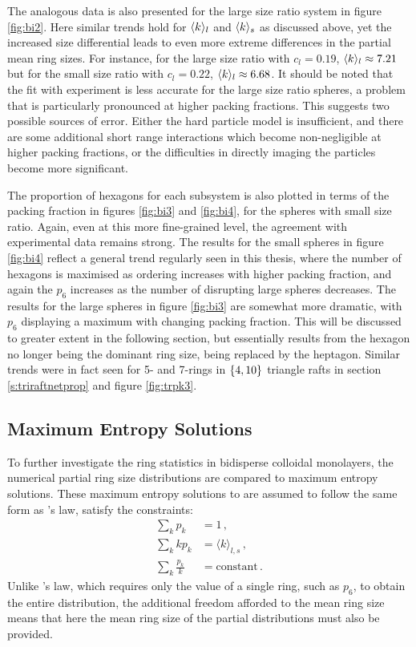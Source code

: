 The analogous data is also presented for the large size ratio system in figure \ref{fig:bi2}.
Here similar trends hold for $\langle k \rangle_l$ and $\langle k \rangle_s$ as discussed %
above, yet the increased size differential leads to even more extreme differences in the partial mean ring sizes.
For instance, for the large size ratio with $c_l=0.19$, $\langle k \rangle_l\approx7.21$ but for the small size ratio with $c_l=0.22$, $\langle k \rangle_l\approx6.68$.
It should be noted that the fit with experiment is less accurate for the large size ratio spheres, a problem that is particularly pronounced at higher packing fractions.
This suggests two possible sources of error.
Either the hard particle model is insufficient, and there are some additional short range interactions which become non\--negligible at higher packing fractions, or the difficulties in directly imaging the particles become more significant. 

The proportion of hexagons for each subsystem is also plotted in terms of the packing fraction in figures \ref{fig:bi3} and \ref{fig:bi4}, for the spheres with small size ratio.
Again, even at this more fine\--grained level, the agreement with experimental data remains strong.
The results for the small spheres in figure \ref{fig:bi4} reflect a general trend regularly seen in this thesis, where the number of hexagons is maximised as ordering increases with higher packing fraction, and again the $p_6$ increases as the number of disrupting large spheres decreases.
The results for the large spheres in figure \ref{fig:bi3} are somewhat more dramatic, with $p_6$ displaying a maximum with changing packing fraction.
This will be discussed to greater extent in the following section, but essentially results from the hexagon no longer being the dominant ring size, being replaced by the heptagon.
Similar trends were in fact seen for 5\-- and 7\--rings in $\left\{4,10\right\}$ triangle rafts in section \ref{s:triraftnetprop} and figure \ref{fig:trpk3}. 

\subsection{Maximum Entropy Solutions}

To further investigate the ring statistics in bidisperse colloidal monolayers, the numerical partial ring size distributions are compared to maximum entropy solutions.
These maximum entropy solutions to are assumed to follow the same form as \lm's law, \ie{} satisfy the constraints:
\begin{align}
	\sum_k p_k &= 1\,, \\
	\sum_k kp_k &= \langle k \rangle_{l,s}\,, \\
	\sum_k \frac{p_k}{k} &= \text{constant}\,.
\end{align}
Unlike \lm's law, which requires only the value of a single ring, such as $p_6$, to obtain the entire distribution, the additional freedom afforded to the mean ring size means that here the mean ring size of the partial distributions must also be provided.

